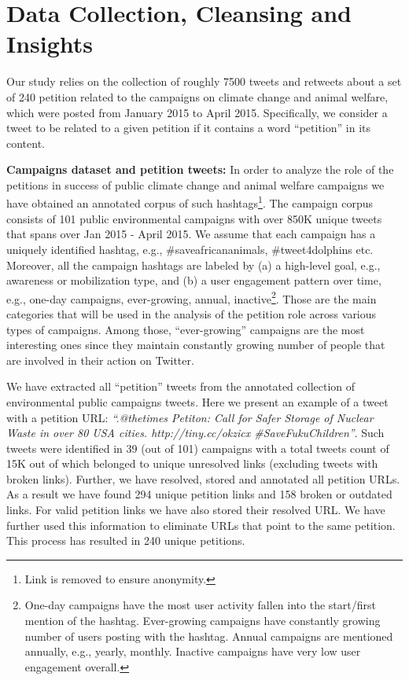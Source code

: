 \section{Data Collection, Cleansing and Insights}
\label{sec:dataset}

Our study relies on the collection of roughly 7500 tweets and retweets about a set of 240 petition related to the campaigns on climate change and animal welfare, which were posted from January 2015 to April 2015. Specifically, we consider a tweet to be related to a given petition if it contains a word ``petition'' in its content.

\textbf{Campaigns dataset and petition tweets:}
In order to analyze the role of the petitions in success of public climate change and animal welfare campaigns
we have obtained an annotated corpus of such hashtags\footnote{Link is removed to ensure anonymity.}.
The campaign corpus consists of 101 public environmental campaigns with over 850K unique tweets that spans over Jan 2015 - April 2015. 
We assume that each campaign has a uniquely identified hashtag, e.g., \#saveafricananimals, \#tweet4dolphins etc.
Moreover, all the campaign hashtags are labeled by (a) a high-level goal, e.g., awareness or mobilization type, and (b) a user engagement pattern over time, e.g., one-day campaigns, ever-growing, annual, inactive\footnote{One-day campaigns have the most user activity fallen into the start/first mention of the hashtag.
Ever-growing campaigns have constantly growing number of users posting with the hashtag.
Annual campaigns are mentioned annually, e.g., yearly, monthly. Inactive campaigns have very low user engagement overall.}.
Those are the main categories that will be used in the analysis of the petition role across various types of campaigns. Among those, ``ever-growing'' campaigns are the most interesting ones since they maintain constantly growing number of people that are involved in their action on Twitter.

We have extracted all ``petition'' tweets from the annotated collection of environmental public campaigns tweets.
Here we present an example of a tweet with a petition URL: \textit{``.@thetimes Petiton: Call for Safer Storage of Nuclear Waste in over 80 USA cities. http://tiny.cc/okzicx  \#SaveFukuChildren''}.
Such tweets were identified in 39 (out of 101) campaigns with a total tweets count of 15K out of which belonged to unique unresolved links (excluding tweets with broken links).
Further, we have resolved, stored and annotated all petition URLs. As a result we have found 294 unique petition links and 158 broken or outdated links.
For valid petition links we have also stored their resolved URL. We have further used this information to eliminate URLs that point to the same petition.
This process has resulted in 240 unique petitions.

